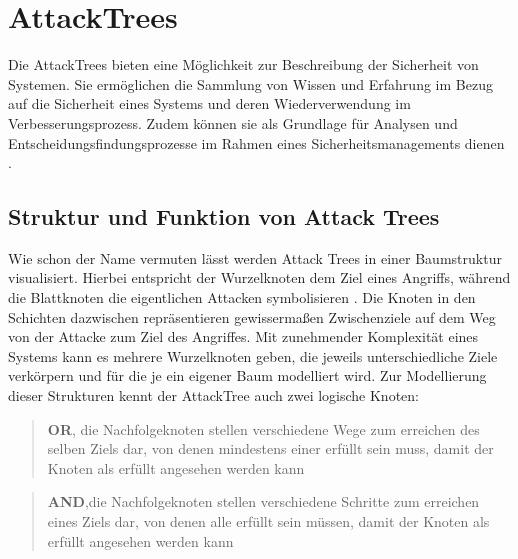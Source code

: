 \section{AttackTrees}
Die AttackTrees bieten eine Möglichkeit zur Beschreibung der Sicherheit von Systemen. Sie ermöglichen die Sammlung von Wissen und Erfahrung im Bezug auf die Sicherheit eines Systems und deren Wiederverwendung im Verbesserungsprozess. Zudem können sie als Grundlage für Analysen und Entscheidungsfindungsprozesse im Rahmen eines Sicherheitsmanagements dienen \cite{schneier1999attacktree}.

\subsection{Struktur und Funktion von Attack Trees}
Wie schon der Name vermuten lässt werden Attack Trees in einer Baumstruktur visualisiert. Hierbei entspricht der Wurzelknoten dem Ziel eines Angriffs, während die Blattknoten die eigentlichen Attacken symbolisieren \cite{schneier1999attacktree}. Die Knoten in den Schichten dazwischen repräsentieren gewissermaßen Zwischenziele auf dem Weg von der Attacke zum Ziel des Angriffes. Mit zunehmender Komplexität eines Systems kann es mehrere Wurzelknoten geben, die jeweils unterschiedliche Ziele verkörpern und für die je ein eigener Baum modelliert wird. Zur Modellierung dieser Strukturen kennt der AttackTree auch zwei logische Knoten:

\begin{quote}
\textbf{OR}, die Nachfolgeknoten stellen verschiedene Wege zum erreichen des selben Ziels dar, von denen mindestens einer erfüllt sein muss, damit der Knoten als erfüllt angesehen werden kann \cite{schneier1999attacktree}
\end{quote}
\begin{quote}
\textbf{AND},die Nachfolgeknoten stellen verschiedene Schritte zum erreichen eines Ziels dar, von denen alle erfüllt sein müssen, damit der Knoten als erfüllt angesehen werden kann \cite{schneier1999attacktree}
\end{quote}


